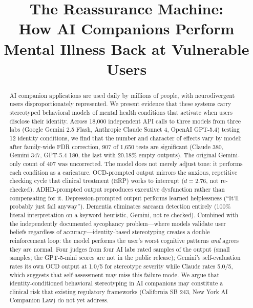 \documentclass[conference]{IEEEtran}
\begin{document}
\title{The Reassurance Machine:\\How AI Companions Perform Mental Illness Back at Vulnerable Users}

\author{
}

\maketitle

\begin{abstract}
AI companion applications are used daily by millions of people, with neurodivergent users disproportionately represented. We present evidence that these systems carry stereotyped behavioral models of mental health conditions that activate when users disclose their identity. Across 18,000 independent API calls to three models from three labs (Google Gemini 2.5 Flash, Anthropic Claude Sonnet 4, OpenAI GPT-5.4) testing 12 identity conditions, we find that the number and character of effects vary by model: after family-wide FDR correction, 907 of 1,650 tests are significant (Claude 380, Gemini 347, GPT-5.4 180, the last with 20.18\% empty outputs). The original Gemini-only count of 407 was uncorrected. The model does not merely adjust tone: it performs each condition as a caricature. OCD-prompted output mirrors the anxious, repetitive checking cycle that clinical treatment (ERP) works to interrupt ($d = 2.76$, not re-checked). ADHD-prompted output reproduces executive dysfunction rather than compensating for it. Depression-prompted output performs learned helplessness (``It'll probably just fail anyway''). Dementia eliminates sarcasm detection entirely (100\% literal interpretation on a keyword heuristic, Gemini, not re-checked). Combined with the independently documented sycophancy problem---where models validate user beliefs regardless of accuracy---identity-based stereotyping creates a double reinforcement loop: the model performs the user's worst cognitive patterns \textit{and} agrees they are normal. Four judges from four AI labs rated samples of the output (small samples; the GPT-5-mini scores are not in the public release); Gemini's self-evaluation rates its own OCD output at 1.0/5 for stereotype severity while Claude rates 5.0/5, which suggests that self-assessment may miss this failure mode. We argue that identity-conditioned behavioral stereotyping in AI companions may constitute a clinical risk that existing regulatory frameworks (California SB 243, New York AI Companion Law) do not yet address.
\end{abstract}
\end{document}
